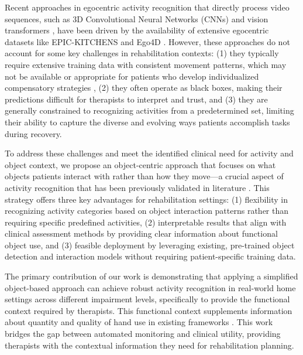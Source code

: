 \documentclass[journal,twoside,web]{ieeecolor}
\begin{document}
Recent approaches in egocentric activity recognition that directly process video sequences, such as 3D Convolutional Neural Networks (CNNs) \cite{Carreira2017-iz, Feichtenhofer2018-ac} and vision transformers \cite{Bertasius2021-re} \cite{Liu2021-tq}, have been driven by the availability of extensive egocentric datasets like EPIC-KITCHENS \cite{Damen2020-ep} and Ego4D \cite{Grauman2021-pg}. However, these approaches do not account for some key challenges in rehabilitation contexts: (1) they typically require extensive training data with consistent movement patterns, which may not be available or appropriate for patients who develop individualized compensatory strategies \cite{Jones2017-zu}, (2) they often operate as black boxes, making their predictions difficult for therapists to interpret and trust, and (3) they are generally constrained to recognizing activities from a predetermined set, limiting their ability to capture the diverse and evolving ways patients accomplish tasks during recovery.

To address these challenges and meet the identified clinical need for activity and object context, we propose an object-centric approach that focuses on what objects patients interact with rather than how they move---a crucial aspect of activity recognition that has been previously validated in literature \cite{Fathi2011-hk, Pirsiavash2012-ly, Nabiei2015-wb, Lonini2016-wg, Granada2020-ge}. This strategy offers three key advantages for rehabilitation settings: (1) flexibility in recognizing activity categories based on object interaction patterns rather than requiring specific predefined activities, (2) interpretable results that align with clinical assessment methods by providing clear information about functional object use, and (3) feasible deployment by leveraging existing, pre-trained object detection and interaction models without requiring patient-specific training data.

The primary contribution of our work is demonstrating that applying a simplified object-based approach can achieve robust activity recognition in real-world home settings across different impairment levels, specifically to provide the functional context required by therapists. This functional context supplements information about quantity \cite{Bandini2022-rs} and quality \cite{Dousty2023-kn, Zhao2024-bc} of hand use in existing frameworks \cite{Kadambi2023-iv}. This work bridges the gap between automated monitoring and clinical utility, providing therapists with the contextual information they need for rehabilitation planning.
\end{document}
